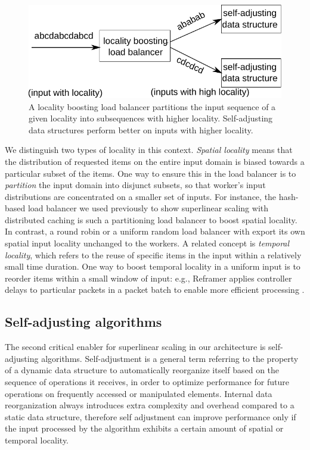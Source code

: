 \begin{figure}
  \centering
  \includegraphics[width=.85\linewidth]{fig/schema.pdf}
  \caption{A locality boosting load balancer partitions the input sequence of a given locality into subsequences with higher locality. Self-adjusting data structures perform better on inputs with higher locality.}
  \label{fig:locality-boosting-lb}
\end{figure}

We distinguish two types of locality in this context. \emph{Spatial locality} means that the distribution of requested items on the entire input domain is biased towards a particular subset of the items. One way to ensure this in the load balancer is to \emph{partition} the input domain into disjunct subsets, so that worker's input distributions are concentrated on a smaller set of inputs. For instance, the hash-based load balancer we used previously to show superlinear scaling with distributed caching is such a partitioning load balancer to boost spatial locality. In contrast, a round robin or a uniform random load balancer with export its own spatial input locality unchanged to the workers. A related concept is \emph{temporal locality}, which refers to the reuse of specific items in the input within a relatively small time duration. One way to boost temporal locality in a uniform input is to reorder items within a small window of input: e.g., Reframer applies controller delays to particular packets in a packet batch to enable more efficient processing \cite{276946,246322}.

\subsection{Self-adjusting algorithms}
\label{sec:sa-alg}

The second critical enabler for superlinear scaling in our architecture is self-adjusting algorithms. Self-adjustment is a general term referring to the property of a dynamic data structure to automatically reorganize itself based on the sequence of operations it receives, in order to optimize performance for future operations on frequently accessed or manipulated elements. Internal data reorganization always introduces extra complexity and overhead compared to a static data structure, therefore self adjustment can improve performance only if the input processed by the algorithm exhibits a certain amount of spatial or temporal locality.

